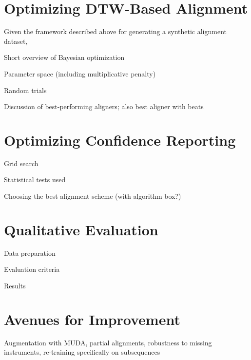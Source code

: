 \documentclass{article}
\begin{document}
\section{Optimizing DTW-Based Alignment}
\label{sec:optimizing}

Given the framework described above for generating a synthetic alignment dataset, 

Short overview of Bayesian optimization

Parameter space (including multiplicative penalty)

Random trials

Discussion of best-performing aligners; also best aligner with beats

\section{Optimizing Confidence Reporting}
\label{sec:confidence}

Grid search

Statistical tests used

Choosing the best alignment scheme (with algorithm box?)

\section{Qualitative Evaluation}
\label{sec:qualitative}

Data preparation

Evaluation criteria

Results

\section{Avenues for Improvement}
\label{sec:avenues}

Augmentation with MUDA, partial alignments, robustness to missing instruments, re-training specifically on subsequences



\end{document}
